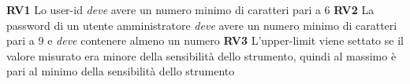 \documentclass[12pt,a4paper,onecolumn,x11names]{article}
\begin{document}
		\begin{flushleft}
			\textbf{RV1} Lo user-id \textit{deve} avere un numero minimo di caratteri pari a 6\newline
			\textbf{RV2} La password di un utente amministratore \textit{deve} avere un numero minimo di caratteri pari a 9 e \textit{deve} contenere almeno un numero\newline
			\textbf{RV3} L'upper-limit viene settato se il valore misurato era minore della sensibilità dello strumento, quindi al massimo è pari al minimo della sensibilità dello strumento
		\end{flushleft}

%			
		
\newpage
\end{document}
